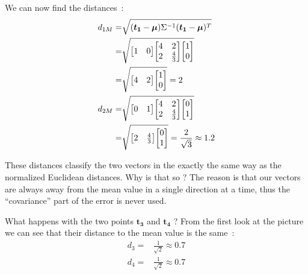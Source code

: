 \documentclass[11pt,twocolumn]{amsart} %
\newcommand{\ve}[1]{\boldsymbol{#1}}
\newenvironment{m}{\begin{bmatrix}}{\end{bmatrix}}
\begin{document}
We can now find the distances~:
\begin{align*}
  d_{1M} = & \sqrt{(\ve{t_1} - \ve{\mu})\Sigma^{-1}(\ve{t_1} - \ve{\mu})^T} \\
         = & \sqrt{\begin{m} 1 & 0 \end{m} \begin{m} 4 & 2 \\ 2 & \frac{4}{3}\end{m} \begin{m} 1 \\ 0 \end{m}} \\
         = & \sqrt{\begin{m} 4 & 2 \end{m} \begin{m} 1 \\ 0 \end{m}} = 2\\
  d_{2M} = & \sqrt{\begin{m} 0 & 1 \end{m} \begin{m} 4 & 2 \\ 2 & \frac{4}{3}\end{m} \begin{m} 0 \\ 1 \end{m}} \\
         = & \sqrt{\begin{m} 2 & \frac{4}{3}\end{m} \begin{m} 0 \\ 1 \end{m}} = \frac{2}{\sqrt{3}} \approx 1.2\\
\end{align*}

These distances classify the two vectors in the exactly the same way as the normalized Euclidean distances. Why is that so ? The reason is that our vectors are always away from the mean value in a single direction at a time, thus the ``covariance'' part of the error is never used.

What happens with the two points $\ve{t_3}$ and $\ve{t_4}$ ? From the first look at the picture we can see that their distance to the mean value is the same~:
\begin{align*}
  d_3 = & \frac{1}{\sqrt{2}} \approx 0.7 \\
  d_4 = & \frac{1}{\sqrt{2}} \approx 0.7
\end{align*}
\end{document}

